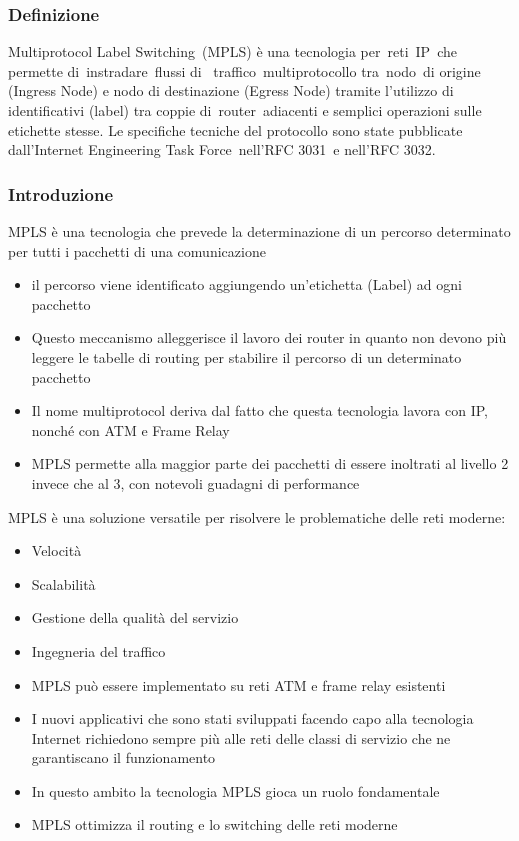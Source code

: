 \documentclass[8pt]{extarticle}
\begin{document}
\subsubsection{Definizione}
Multiprotocol Label Switching (MPLS) è una tecnologia per reti IP che permette di instradare flussi di 
traffico multiprotocollo tra nodo di origine (Ingress Node) e nodo di destinazione (Egress Node) tramite 
l'utilizzo di identificativi (label) tra coppie di router adiacenti e semplici operazioni sulle etichette 
stesse. Le specifiche tecniche del protocollo sono state pubblicate dall'Internet Engineering Task 
Force nell'RFC 3031 e nell'RFC 3032.
\subsubsection{Introduzione}
MPLS è una tecnologia che prevede la determinazione di un percorso determinato per tutti i pacchetti 
di una comunicazione
\begin{itemize}
    \item il percorso viene identificato aggiungendo un’etichetta (Label) ad ogni pacchetto
    \item Questo meccanismo alleggerisce il lavoro dei router in quanto non devono più leggere le tabelle di 
    routing per stabilire il percorso di un determinato pacchetto
    \item Il nome multiprotocol deriva dal fatto che questa tecnologia lavora con IP, nonché con ATM e Frame Relay
    \item MPLS permette alla maggior parte dei pacchetti di essere inoltrati al livello 2 invece che al 3, 
    con notevoli guadagni di performance
\end{itemize}
\noindent
MPLS è una soluzione versatile per risolvere le problematiche delle reti moderne:
\begin{itemize}
    \item Velocità
    \item Scalabilità
    \item Gestione della qualità del servizio
    \item Ingegneria del traffico
    \item MPLS può essere implementato su reti ATM e frame relay esistenti
    \item I nuovi applicativi che sono stati sviluppati facendo capo alla tecnologia Internet richiedono 
    sempre più alle reti delle classi di servizio che ne garantiscano il funzionamento
    \item In questo ambito la tecnologia MPLS gioca un ruolo fondamentale
    \item MPLS ottimizza il routing e lo switching delle reti moderne
\end{itemize}
\end{document}
